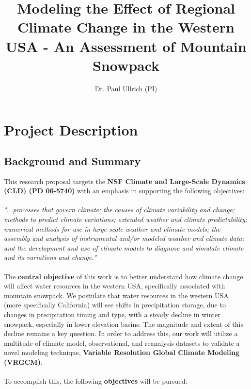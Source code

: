 \documentclass[11pt]{article}
\title{\textbf{Modeling the Effect of Regional Climate Change in the Western USA - An Assessment of Mountain Snowpack}}
\author{Dr. Paul Ullrich (PI)}
\date{ }
\begin{document}
  

\maketitle

\tableofcontents
\newpage

\section{Project Description}
\subsection{Background and Summary}
This research proposal targets the \textbf{NSF Climate and Large-Scale Dynamics (CLD) (PD 06-5740)} with an emphasis in supporting the following objectives:
\\\\
\textit{"...processes that govern climate; the causes of climate variability and change; methods to predict climate variations; extended weather and climate predictability; numerical methods for use in large-scale weather and climate models; the assembly and analysis of instrumental and/or modeled weather and climate data; and the development and use of climate models to diagnose and simulate climate and its variations and change."}
\\\\
The \textbf{central objective} of this work is to better understand how climate change will affect water resources in the western USA, specifically associated with mountain snowpack.  We postulate that water resources in the western USA (more specifically California) will see shifts in precipitation storage, due to changes in precipitation timing and type, with a steady decline in winter snowpack, especially in lower elevation basins.  The magnitude and extent of this decline remains a key question.  In order to address this, our work will utilize a multitude of climate model, observational, and reanalysis datasets to validate a novel modeling technique, \textbf{Variable Resolution Global Climate Modeling (VRGCM)}.
\\\\
To accomplish this, the following \textbf{objectives} will be pursued:
\end{document}
